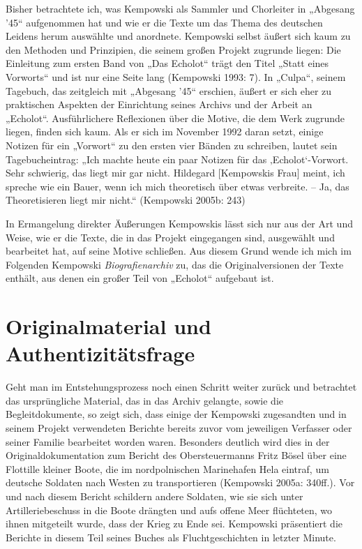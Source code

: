 \begin{multicols*}{2}
Bisher betrachtete ich, was Kempowski als Sammler und Chorleiter in „Abgesang ’45“ aufgenommen hat und wie er die Texte um das Thema des deutschen Leidens herum auswählte und anordnete. Kempowski selbst äußert sich kaum zu den Methoden und Prinzipien, die seinem großen Projekt zugrunde liegen: Die Einleitung zum ersten Band von „Das Echolot“ trägt den Titel „Statt eines Vorworts“ und ist nur eine Seite lang (Kempowski 1993: 7). In „Culpa“, seinem Tagebuch, das zeitgleich mit „Abgesang ’45“ erschien, äußert er sich eher zu praktischen Aspekten der Einrichtung seines Archivs und der Arbeit an „Echolot“. Ausführlichere Reflexionen über die Motive, die dem Werk zugrunde liegen, finden sich kaum. Als er sich im November 1992 daran setzt, einige Notizen für ein „Vorwort“ zu den ersten vier Bänden zu schreiben, lautet sein Tagebucheintrag: „Ich machte heute ein paar Notizen für das ‚Echolot‘-Vorwort. Sehr schwierig, das liegt mir gar nicht. Hildegard [Kempowskis Frau] meint, ich spreche wie ein Bauer, wenn ich mich theoretisch über etwas verbreite. – Ja, das Theoretisieren liegt mir nicht.“ (Kempowski 2005b: 243)

In Ermangelung direkter Äußerungen Kempowskis lässt sich nur aus der Art und Weise, wie er die Texte, die in das Projekt eingegangen sind, ausgewählt und bearbeitet hat, auf seine Motive schließen. Aus diesem Grund wende ich mich im Folgenden Kempowski \textit{Biografienarchiv} zu, das die Originalversionen der Texte enthält, aus denen ein großer Teil von „Echolot“ aufgebaut ist.

\section{Originalmaterial und Authentizitätsfrage}

\noindent Geht man im Entstehungsprozess noch einen Schritt weiter zurück und betrachtet das ursprüngliche Material, das in das Archiv gelangte, sowie die Begleitdokumente, so zeigt sich, dass einige der Kempowski zugesandten und in seinem Projekt verwendeten Berichte bereits zuvor vom jeweiligen Verfasser oder seiner Familie bearbeitet worden waren. Besonders deutlich wird dies in der Originaldokumentation zum Bericht des Obersteuermanns Fritz Bösel über eine Flottille kleiner Boote, die im nordpolnischen Marinehafen Hela eintraf, um deutsche Soldaten nach Westen zu transportieren (Kempowski 2005a: 340ff.). Vor und nach diesem Bericht schildern andere Soldaten, wie sie sich unter Artilleriebeschuss in die Boote drängten und aufs offene Meer flüchteten, wo ihnen mitgeteilt wurde, dass der Krieg zu Ende sei. Kempowski präsentiert die Berichte in diesem Teil seines Buches als Fluchtgeschichten in letzter Minute.


\end{multicols*}
